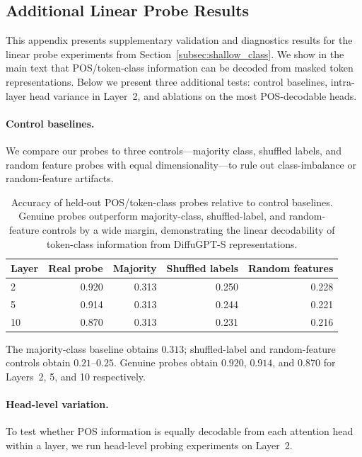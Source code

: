\documentclass{article} %
\begin{document}
\subsection{Additional Linear Probe Results}
\label{app:linear_probe_results}

This appendix presents supplementary validation and diagnostics results for the linear probe experiments from Section~\ref{subsec:shallow_class}. We show in the main text that POS/token-class information can be decoded from masked token representations. Below we present three additional tests: control baselines, intra-layer head variance in Layer~2, and ablations on the most POS-decodable heads.

\paragraph{Control baselines.}
We compare our probes to three controls---majority class, shuffled labels, and random feature probes with equal dimensionality---to rule out class-imbalance or random-feature artifacts.

\begin{table}[H]
\centering
\small
\begin{tabular}{lrrrr}
\toprule
Layer & Real probe & Majority & Shuffled labels & Random features \\
\midrule
2 & 0.920 & 0.313 & 0.250 & 0.228 \\
5 & 0.914 & 0.313 & 0.244 & 0.221 \\
10 & 0.870 & 0.313 & 0.231 & 0.216 \\
\bottomrule
\end{tabular}
\caption{Accuracy of held-out POS/token-class probes relative to control baselines. Genuine probes outperform majority-class, shuffled-label, and random-feature controls by a wide margin, demonstrating the linear decodability of token-class information from DiffuGPT-S representations.}
\label{tab:pos_probe_controls}
\end{table}

The majority-class baseline obtains $0.313$; shuffled-label and random-feature controls obtain $0.21$--$0.25$. Genuine probes obtain $0.920$, $0.914$, and $0.870$ for Layers~2, 5, and 10 respectively.

\paragraph{Head-level variation.}
To test whether POS information is equally decodable from each attention head within a layer, we run head-level probing experiments on Layer~2.
\end{document}
